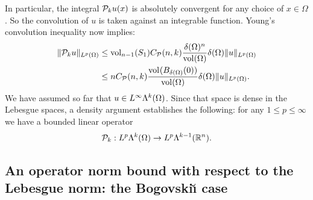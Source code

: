 \documentclass[10pt,a4paper]{article}
\begin{document}
In particular, the integral ${\mathcal P}_{k} u(x)$ is absolutely convergent for any choice of $x \in \Omega$. 
So the convolution of $u$ is taken against an integrable function. 
Young's convolution inequality now implies: 
\begin{align*}
    \| {\mathcal P}_{k} u \|_{L^{p}(\Omega)}
    &
    \leq 
    \operatorname{vol}_{n-1}(S_1) C_{{\mathcal P}}(n,k) \frac{ {\delta}(\Omega)^{n} }{\operatorname{vol}(\Omega)} 
    {\delta}(\Omega)
    \| u \|_{L^{p}(\Omega)}
    \\&
    \leq 
    n C_{{\mathcal P}}(n,k) \frac{ \operatorname{vol}_{}(B_{{\delta}(\Omega)}(0)) }{\operatorname{vol}(\Omega)} 
    {\delta}(\Omega)
    \| u \|_{L^{p}(\Omega)}
    .
\end{align*}
We have assumed so far that $u \in L^{\infty}\Lambda^{k}(\Omega)$. 
Since that space is dense in the Lebesgue spaces, a density argument establishes the following: 
for any $1 \leq p \leq \infty$ we have a bounded linear operator 
\begin{gather*}
    {\mathcal P}_{k} : L^{p}\Lambda^{k}(\Omega) \rightarrow L^{p}\Lambda^{k-1}({\mathbb R}^n).
\end{gather*}
% 


\subsection{An operator norm bound with respect to the Lebesgue norm: the Bogovski\u{\i} case}
\end{document}
